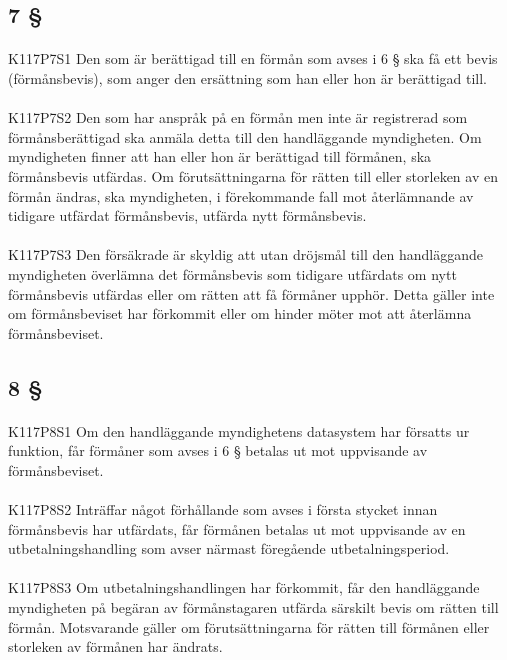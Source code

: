 \documentclass[a4paper,notitlepage,openany,10pt]{book}
\begin{document}
\subsection*{7 §}
\paragraph*{}
{\tiny K117P7S1}
Den som är berättigad till en förmån som avses i 6 § ska få ett bevis (förmånsbevis), som anger den ersättning som han eller hon är berättigad till.
\paragraph*{}
{\tiny K117P7S2}
Den som har anspråk på en förmån men inte är registrerad som förmånsberättigad ska anmäla detta till den handläggande myndigheten. Om myndigheten finner att han eller hon är berättigad till förmånen, ska förmånsbevis utfärdas. Om förutsättningarna för rätten till eller storleken av en förmån ändras, ska myndigheten, i förekommande fall mot återlämnande av tidigare utfärdat förmånsbevis, utfärda nytt förmånsbevis.
\paragraph*{}
{\tiny K117P7S3}
Den försäkrade är skyldig att utan dröjsmål till den handläggande myndigheten överlämna det förmånsbevis som tidigare utfärdats om nytt förmånsbevis utfärdas eller om rätten att få förmåner upphör. Detta gäller inte om förmånsbeviset har förkommit eller om hinder möter mot att återlämna förmånsbeviset.
\subsection*{8 §}
\paragraph*{}
{\tiny K117P8S1}
Om den handläggande myndighetens datasystem har försatts ur funktion, får förmåner som avses i 6 § betalas ut mot uppvisande av förmånsbeviset.
\paragraph*{}
{\tiny K117P8S2}
Inträffar något förhållande som avses i första stycket innan förmånsbevis har utfärdats, får förmånen betalas ut mot uppvisande av en utbetalningshandling som avser närmast föregående utbetalningsperiod.
\paragraph*{}
{\tiny K117P8S3}
Om utbetalningshandlingen har förkommit, får den handläggande myndigheten på begäran av förmånstagaren utfärda särskilt bevis om rätten till förmån. Motsvarande gäller om förutsättningarna för rätten till förmånen eller storleken av förmånen har ändrats.
\end{document}
